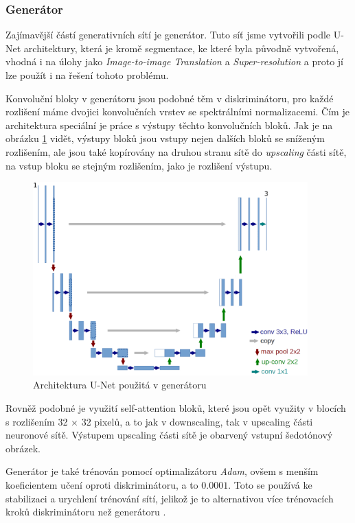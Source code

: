 \documentclass[12pt, a4paper]{article}
\begin{document}
    \subsubsection{Generátor}
    Zajímavější částí generativních sítí je generátor. Tuto síť jsme vytvořili podle U-Net architektury, která je kromě segmentace, ke které byla původně vytvořená, vhodná i na úlohy jako \textit{Image-to-image Translation} a \textit{Super-resolution} a proto jí lze použít i na řešení tohoto problému. 
    
    Konvoluční bloky v generátoru jsou podobné těm v diskriminátoru, pro každé rozlišení máme dvojici konvolučních vrstev se spektrálními normalizacemi. Čím je architektura speciální je práce s výstupy těchto konvolučních bloků. Jak je na obrázku \ref{unet} vidět, výstupy bloků jsou vstupy nejen dalších bloků se sníženým rozlišením, ale jsou také kopírovány na druhou stranu sítě do \textit{upscaling} části sítě, na vstup bloku se stejným rozlišením, jako je rozlišení výstupu.
    
    \begin{figure}
        \centering
        \includegraphics[width=300pt]{unet.png}
        \caption{Architektura U-Net použitá v generátoru}
        \label{unet}
    \end{figure}
    
    Rovněž podobné je využití self-attention bloků, které jsou opět využity v blocích s rozlišením 32 $\times$ 32 pixelů, a to jak v downscaling, tak v upscaling části neuronové sítě. Výstupem upscaling části sítě je obarvený vstupní šedotónový obrázek. 
    
    Generátor je také trénován pomocí optimalizátoru \textit{Adam}, ovšem s menším koeficientem učení oproti diskriminátoru, a to $0.0001$. Toto se používá ke stabilizaci a urychlení trénování sítí, jelikož je to alternativou více trénovacích kroků diskriminátoru než generátoru \cite{ttur}. 
    
\end{document}
